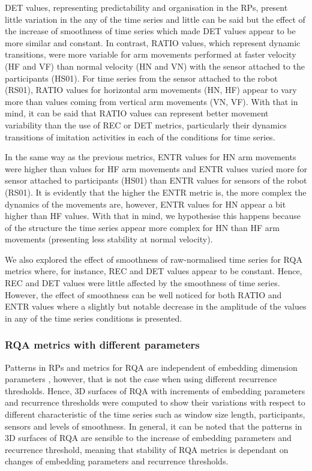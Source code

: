 DET values, representing predictability and organisation in 
the RPs, present little variation in the any of the time series and 
little can be said but the effect of the increase of smoothness of 
time series which made DET values appear to be more similar and constant. 
In contrast, RATIO values, which represent dynamic 
transitions, were more variable for arm movements performed at faster
velocity (HF and VF) than normal velocity (HN and VN) 
with the sensor attached to the participants (HS01). 
For time series from the sensor attached to the robot (RS01), 
RATIO values for horizontal arm movements (HN, HF) 
appear to vary more than values coming from vertical arm movements (VN, VF).
With that in mind, it can be said that RATIO values can represent
better movement variability than the use of REC or DET metrics, 
particularly their dynamics transitions of imitation activities 
in each of the conditions for time series.

In the same way as the previous metrics, ENTR values for HN arm movements
were higher than values for HF arm movements and ENTR values varied more 
for sensor attached to participants (HS01) 
than ENTR values for sensors of the robot (RS01). It is evidently that 
the higher the ENTR metric is, the more complex the dynamics of the movements 
are, however, ENTR values for HN appear a bit higher than HF values.
With that in mind, we hypothesise this happens because of the structure 
the time series appear more complex for HN than HF arm movements 
(presenting less stability at normal velocity).

We also explored the effect of smoothness of raw-normalised time series 
for RQA metrics where, for instance, REC and DET values 
appear to be constant. Hence, REC and DET values were little 
affected by the smoothness of time series. 
However, the effect of smoothness can be well noticed for both
RATIO and ENTR values where a slightly but notable decrease in the amplitude 
of the values in any of the time series conditions is presented.

\subsubsection{RQA metrics with different parameters}
Patterns in RPs and metrics for RQA are independent of embedding 
dimension parameters \citep{iwanski1998}, however, that is not the case 
when using different recurrence thresholds. 
Hence, 3D surfaces of RQA with increments of embedding parameters and
recurrence thresholds were computed to show their variations with respect 
to different characteristic of the time series such as window size length,
participants, sensors and levels of smoothness.
In general, it can be noted that the patterns in 3D surfaces of RQA 
are sensible to the increase of embedding parameters and recurrence threshold,
meaning that stability of RQA metrics is dependant on changes of 
embedding parameters and recurrence thresholds. 

